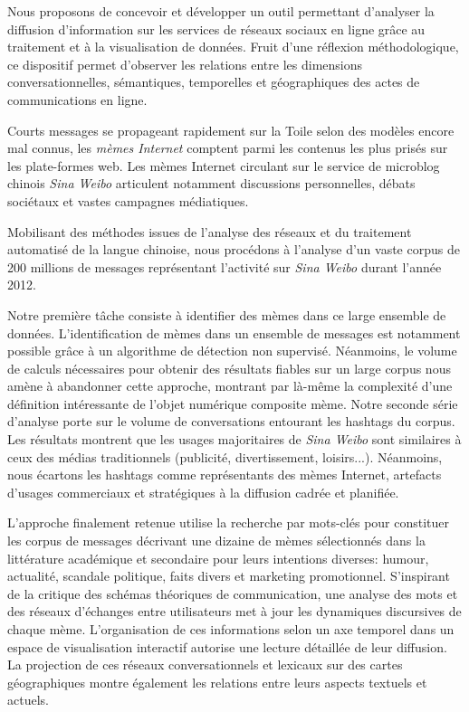 
Nous proposons de concevoir et développer un outil permettant d’analyser la diffusion d’information sur les services de réseaux sociaux en ligne grâce au traitement et à la visualisation de données. Fruit d’une réflexion méthodologique, ce dispositif permet d’observer les relations entre les dimensions conversationnelles, sémantiques, temporelles et géographiques des actes de communications en ligne.

Courts messages se propageant rapidement sur la Toile selon des modèles encore mal connus, les \textit{mèmes Internet} comptent parmi les contenus les plus prisés sur les plate-formes web. Les mèmes Internet circulant sur le service de microblog chinois \textit{Sina Weibo} articulent notamment discussions personnelles, débats sociétaux et vastes campagnes médiatiques.

Mobilisant des méthodes issues de l’analyse des réseaux et du traitement automatisé de la langue chinoise, nous procédons à l’analyse d’un vaste corpus de 200 millions de messages représentant l’activité sur \textit{Sina Weibo} durant l’année 2012. 

Notre première tâche consiste à identifier des mèmes dans ce large ensemble de données. L’identification de mèmes dans un ensemble de messages est notamment possible grâce à un algorithme de détection non supervisé. Néanmoins, le volume de calculs nécessaires pour obtenir des résultats fiables sur un large corpus nous amène à abandonner cette approche, montrant par là-même la complexité d’une définition intéressante de l’objet numérique composite mème. Notre seconde série d’analyse porte sur le volume de conversations entourant les hashtags du corpus. Les résultats montrent que les usages majoritaires de \textit{Sina Weibo} sont similaires à ceux des médias traditionnels (publicité, divertissement, loisirs...). Néanmoins, nous écartons les hashtags comme représentants des mèmes Internet, artefacts d’usages commerciaux et stratégiques à la diffusion cadrée et planifiée. 

L’approche finalement retenue utilise la recherche par mots-clés pour constituer les corpus de messages décrivant une dizaine de mèmes sélectionnés dans la littérature académique et secondaire pour leurs intentions diverses: humour, actualité, scandale politique, faits divers et marketing promotionnel. S’inspirant de la critique des schémas théoriques de communication, une analyse des mots et des réseaux d’échanges entre utilisateurs met à jour les dynamiques discursives de chaque mème. L’organisation de ces informations selon un axe temporel dans un espace de visualisation interactif autorise une lecture détaillée de leur diffusion. La projection de ces réseaux conversationnels et lexicaux sur des cartes géographiques montre également les relations entre leurs aspects textuels et actuels.

